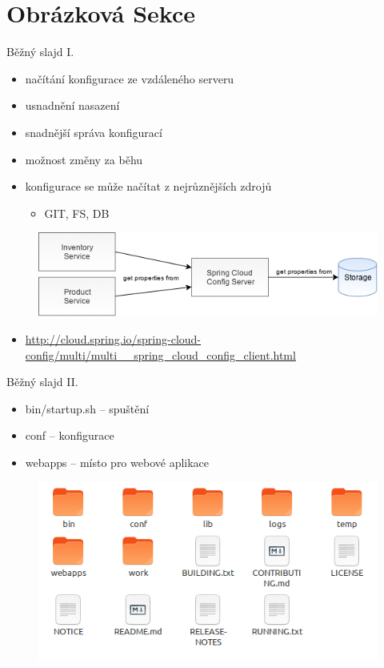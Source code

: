 \documentclass{beamer}
\begin{document}
\section{Obrázková Sekce}
\begin{frame}{Běžný slajd I.}
	\begin{itemize}
		\item načítání konfigurace ze vzdáleného serveru
		\item usnadnění nasazení
		\item snadnější správa konfigurací
		\item možnost změny za běhu
		\item konfigurace se může načítat z nejrůznějších zdrojů
		      \begin{itemize}
			      \item GIT, FS, DB
		      \end{itemize}
	\end{itemize}
	\begin{figure}[htp]
		\includegraphics[width=\linewidth]{images/config.png}
	\end{figure}
	\begin{itemize}
		\item \url{http://cloud.spring.io/spring-cloud-config/multi/multi__spring_cloud_config_client.html}
	\end{itemize}
\end{frame}
\begin{frame}{Běžný slajd II.}
	\begin{itemize}
		\item bin/startup.sh -- spuštění
		\item conf -- konfigurace
		\item webapps -- místo pro webové aplikace
	\end{itemize}
	\begin{figure}[htp]
		\includegraphics[width=\linewidth]{images/tomcat-webapps.png}
	\end{figure}
\end{frame}
\end{document}
